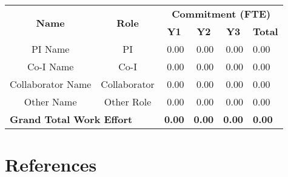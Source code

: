 \documentclass[oneside,12pt]{article}
\begin{document}
    \begin{table}[h]
        \centering
        \begin{tabular}{|c|c|r|r|r|l|}
            \hline
            \multirow{2}{*}{\textbf{Name}} & \multirow{2}{*}{\textbf{Role}} & \multicolumn{4}{c|}{\textbf{Commitment (FTE)}} \\
            \cline{3-6}
            & & \multicolumn{1}{c|}{\textbf{Y1}} & \multicolumn{1}{c|}{\textbf{Y2}} & \multicolumn{1}{c|}{\textbf{Y3}} & \multicolumn{1}{c|}{\textbf{Total}} \\
            \hline
            PI Name           & PI           & 0.00 & 0.00 & 0.00 & 0.00 \\
            Co-I Name         & Co-I         & 0.00 & 0.00 & 0.00 & 0.00 \\
            Collaborator Name & Collaborator & 0.00 & 0.00 & 0.00 & 0.00 \\
            Other Name        & Other Role   & 0.00 & 0.00 & 0.00 & 0.00 \\
            \hline
            \multicolumn{2}{|l|}{\textbf{Grand Total Work Effort}} & \textbf{0.00} & \textbf{0.00} & \textbf{0.00} & \textbf{0.00} \\
            \hline
        \end{tabular}
    \end{table}

    \clearpage

    \section{References}

    \renewcommand{\refname}{\vspace{-2em}}
    
\end{document}
